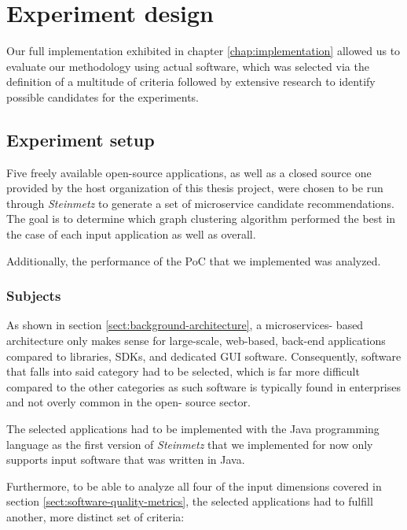 \documentclass[12pt,a4paper]{report}
\begin{document}
\chapter{Experiment design} \label{chap:experiment-design}

Our full implementation exhibited in chapter \ref{chap:implementation} allowed
us to evaluate our methodology using actual software, which was selected via
the definition of a multitude of criteria followed by extensive research to
identify possible candidates for the experiments.



\section{Experiment setup}

Five freely available open-source applications, as well as a closed source one
provided by the host organization of this thesis project, were chosen to be run
through \textit{Steinmetz} to generate a set of microservice candidate
recommendations. The goal is to determine which graph clustering algorithm
performed the best in the case of each input application as well as overall.

Additionally, the performance of the PoC that we implemented was analyzed.


\subsection{Subjects}

As shown in section \ref{sect:background-architecture}, a microservices\hyp
based architecture only makes sense for large\hyp scale, web\hyp based,
back\hyp end applications compared to libraries, SDKs, and dedicated GUI
software. Consequently, software that falls into said category had to be
selected, which is far more difficult compared to the other categories as such
software is typically found in enterprises and not overly common in the open-
source sector.

The selected applications had to be implemented with the Java
programming language as the first version of \textit{Steinmetz} that we
implemented for now only supports input software that was written in Java.

Furthermore, to be able to analyze all four of the input dimensions covered in
section \ref{sect:software-quality-metrics}, the selected applications had to
fulfill another, more distinct set of criteria:
\end{document}
